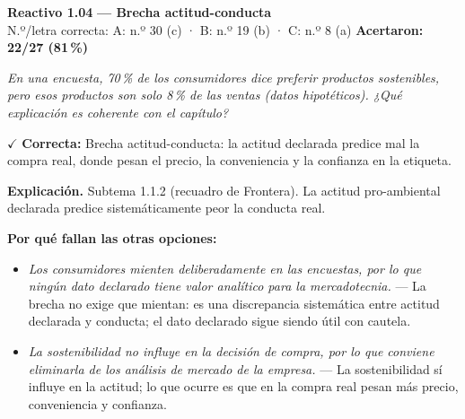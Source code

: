 \documentclass[10pt,letterpaper]{article}
\begin{document}
\begin{minipage}{\textwidth}
{\color{guinda}\textbf{Reactivo 1.04}} \textbf{— Brecha actitud-conducta}\\[-1pt]
{\scriptsize N.º/letra correcta: A: n.º 30 (c) · B: n.º 19 (b) · C: n.º 8 (a) \hfill \textbf{Acertaron: 22/27 (81\,\%)}}

\textit{En una encuesta, 70\,\% de los consumidores dice preferir productos sostenibles, pero esos productos son solo 8\,\% de las ventas (datos hipotéticos). ¿Qué explicación es coherente con el capítulo?}

\textcolor{verde}{$\checkmark$} \textbf{Correcta:} Brecha actitud-conducta: la actitud declarada predice mal la compra real, donde pesan el precio, la conveniencia y la confianza en la etiqueta.

\textbf{Explicación.} Subtema 1.1.2 (recuadro de Frontera). La actitud pro-ambiental declarada predice sistemáticamente peor la conducta real.

\textbf{Por qué fallan las otras opciones:}
\begin{itemize}[itemsep=0pt,topsep=1pt,leftmargin=1.3em,parsep=0pt]
\item[\textcolor{rojo}{$\times$}] \textit{Los consumidores mienten deliberadamente en las encuestas, por lo que ningún dato declarado tiene valor analítico para la mercadotecnia.} --- La brecha no exige que mientan: es una discrepancia sistemática entre actitud declarada y conducta; el dato declarado sigue siendo útil con cautela.
\item[\textcolor{rojo}{$\times$}] \textit{La sostenibilidad no influye en la decisión de compra, por lo que conviene eliminarla de los análisis de mercado de la empresa.} --- La sostenibilidad sí influye en la actitud; lo que ocurre es que en la compra real pesan más precio, conveniencia y confianza.
\end{itemize}
\end{minipage}\par\vspace{5pt}{\color{gray!40}\hrule}\vspace{5pt}
\end{document}
